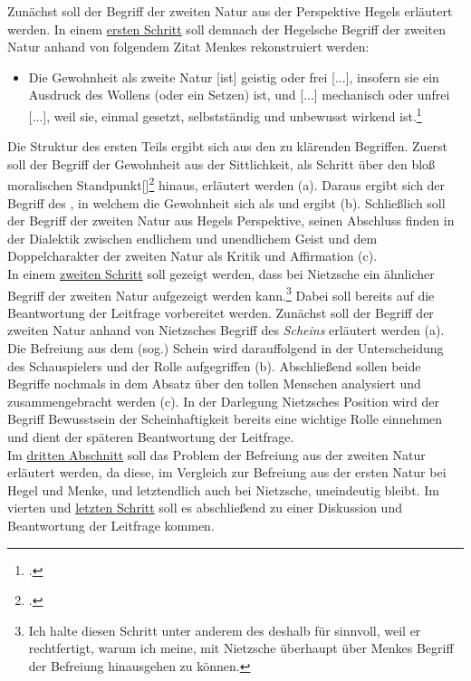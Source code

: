 \documentclass[12pt, a4paper, openany]{report}
\begin{document}
Zunächst soll der Begriff der zweiten Natur aus der Perspektive Hegels erläutert werden. 
In einem \hyperref[abschnitt_1]{ersten Schritt} soll demnach der Hegelsche Begriff der zweiten Natur anhand von folgendem Zitat Menkes rekonstruiert werden:
\begin{itemize}
    \item[] Die Gewohnheit als zweite Natur [ist] geistig oder frei [...], insofern sie ein Ausdruck des Wollens (oder ein Setzen) ist, und [...] mechanisch oder unfrei [...], weil sie, einmal gesetzt, selbstständig und unbewusst wirkend ist.\footcite[][145]{menke_autonomie_2018}
\end{itemize}
Die Struktur des ersten Teils ergibt sich aus den zu klärenden Begriffen. 
Zuerst soll der Begriff der Gewohnheit aus der Sittlichkeit, als Schritt über den \glqq bloß moralischen Standpunkt[]\grqq\footcite[][§ 135, S.139]{hegel_grundlinien_2017} hinaus, erläutert werden (a). 
Daraus ergibt sich der Begriff des , in welchem die Gewohnheit sich als  und  ergibt (b).
Schließlich soll der Begriff der zweiten Natur aus Hegels Perspektive, seinen Abschluss finden in der Dialektik zwischen endlichem und unendlichem Geist und dem Doppelcharakter der zweiten Natur als Kritik und Affirmation (c).\\
In einem \hyperref[abschnitt_2]{zweiten Schritt} soll gezeigt werden, dass bei Nietzsche ein ähnlicher Begriff der zweiten Natur aufgezeigt werden kann.\footnote{Ich halte diesen Schritt unter anderem des deshalb für sinnvoll, weil er rechtfertigt, warum ich meine, mit Nietzsche überhaupt über Menkes Begriff der Befreiung hinausgehen zu können.}
Dabei soll bereits auf die Beantwortung der Leitfrage vorbereitet werden.
Zunächst soll der Begriff der zweiten Natur anhand von Nietzsches Begriff des \textit{Scheins} erläutert werden (a).
Die Befreiung aus dem (sog.) Schein wird darauffolgend in der Unterscheidung des Schauspielers und der Rolle aufgegriffen (b). 
Abschließend sollen beide Begriffe nochmals in dem Absatz über den tollen Menschen analysiert und zusammengebracht werden (c).
In der Darlegung Nietzsches Position wird der Begriff \glqq Bewusstsein der Scheinhaftigkeit\grqq{} bereits eine wichtige Rolle einnehmen und dient der späteren Beantwortung der Leitfrage.\\
Im \hyperref[abschnitt_3]{dritten Abschnitt} soll das Problem der Befreiung aus der zweiten Natur erläutert werden, da diese, im Vergleich zur Befreiung aus der ersten Natur bei Hegel und Menke, und letztendlich auch bei Nietzsche, uneindeutig bleibt.
Im vierten und \hyperref[abschnitt_4]{letzten Schritt} soll es abschließend zu einer Diskussion und Beantwortung der Leitfrage kommen. 
\end{document}
